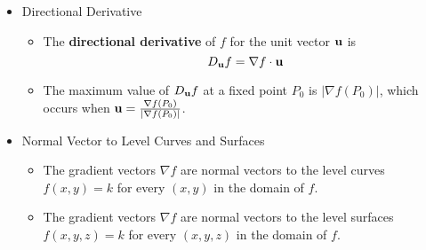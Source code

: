 \begin{itemize}

\item Directional Derivative

  \begin{itemize}
    \item The \textbf{directional derivative} of $f$ for the unit vector $\mathbf{u}$ is 
      \[ 
        D_{\mathbf{u}}f = \nabla f \cdot \mathbf{u}
      \]

    \item The maximum value of $D_{\mathbf{u}}f$ at a fixed point $P_0$ is $|\nabla f(P_0)|$, which occurs when $\mathbf{u}=\frac{\nabla f(P_0)}{|\nabla f(P_0)|}$.
  \end{itemize}
  
\item Normal Vector to Level Curves and Surfaces
  \begin{itemize}
    \item The gradient vectors $\nabla f$ are normal vectors to the level curves $f(x,y)=k$ for every $(x,y)$ in the domain of $f$.
    \item The gradient vectors $\nabla f$ are normal vectors to the level surfaces $f(x,y,z)=k$ for every $(x,y,z)$ in the domain of $f$.
  \end{itemize}





\end{itemize}

